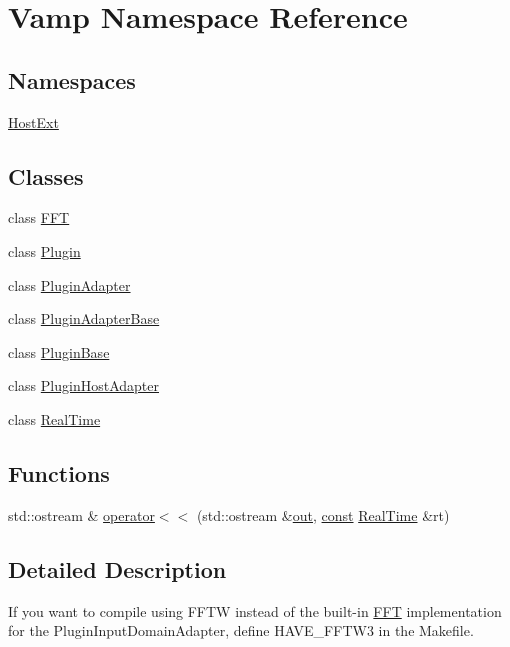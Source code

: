 \hypertarget{namespace_vamp}{}\section{Vamp Namespace Reference}
\label{namespace_vamp}
\subsection*{Namespaces}
\begin{DoxyCompactItemize}
\item 
 \hyperlink{namespace_vamp_1_1_host_ext}{Host\+Ext}
\end{DoxyCompactItemize}
\subsection*{Classes}
\begin{DoxyCompactItemize}
\item 
class \hyperlink{class_vamp_1_1_f_f_t}{F\+FT}
\item 
class \hyperlink{class_vamp_1_1_plugin}{Plugin}
\item 
class \hyperlink{class_vamp_1_1_plugin_adapter}{Plugin\+Adapter}
\item 
class \hyperlink{class_vamp_1_1_plugin_adapter_base}{Plugin\+Adapter\+Base}
\item 
class \hyperlink{class_vamp_1_1_plugin_base}{Plugin\+Base}
\item 
class \hyperlink{class_vamp_1_1_plugin_host_adapter}{Plugin\+Host\+Adapter}
\item 
class \hyperlink{struct_vamp_1_1_real_time}{Real\+Time}
\end{DoxyCompactItemize}
\subsection*{Functions}
\begin{DoxyCompactItemize}
\item 
std\+::ostream \& \hyperlink{namespace_vamp_a84f347b339c111e035f4f0d6ed37f4e0}{operator$<$$<$} (std\+::ostream \&\hyperlink{latency_8c_a71fd1c281affec034757279e4f91c50b}{out}, \hyperlink{getopt1_8c_a2c212835823e3c54a8ab6d95c652660e}{const} \hyperlink{struct_vamp_1_1_real_time}{Real\+Time} \&rt)
\end{DoxyCompactItemize}


\subsection{Detailed Description}
If you want to compile using F\+F\+TW instead of the built-\/in \hyperlink{class_vamp_1_1_f_f_t}{F\+FT} implementation for the Plugin\+Input\+Domain\+Adapter, define H\+A\+V\+E\+\_\+\+F\+F\+T\+W3 in the Makefile.

